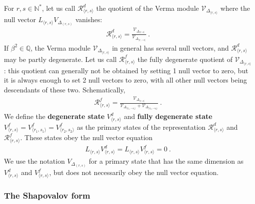 \documentclass[12pt, a4paper]{article}
\newcommand{\myindex}[1]{\textbf{\boldmath #1}}
\theoremstyle{break}
\begin{document}
For $r,s\in\mathbb{N}^*$, let us call $\mathcal{R}^d_{\langle r,s\rangle}$ the quotient of the Verma module $\mathcal{V}_{\Delta_{\langle r,s\rangle}}$ where the null vector $L_{\langle r,s\rangle}V_{\Delta_{(r,s)}}$ vanishes:
\begin{align}
 \mathcal{R}^d_{\langle r,s\rangle} 
 =\frac{\mathcal{V}_{\Delta_{\langle r,s\rangle}}}{\mathcal{V}_{\Delta_{\langle r,-s\rangle}}}\ . 
 \label{rvv}
\end{align}
If $\beta^2\in \mathbb{Q}$, the Verma module $\mathcal{V}_{\Delta_{\langle r,s\rangle}}$ in general has several null vectors, and $\mathcal{R}^d_{\langle r,s\rangle}$ may be partly degenerate. Let us call $\mathcal{R}^f_{\langle r,s\rangle}$ the fully degenerate quotient of  $\mathcal{V}_{\Delta_{\langle r,s\rangle}}$: this quotient can generally not be obtained by setting 1 null vector to zero, but it is always enough to set 2 null vectors to zero, with all other null vectors being descendants of these two. Schematically,
\begin{align}
 \mathcal{R}^f_{\langle r,s\rangle} = \frac{\mathcal{V}_{\Delta_{\langle r,s\rangle}}}{\mathcal{V}_{\Delta_{\langle r_1,-s_1\rangle}}+ \mathcal{V}_{\Delta_{\langle r_2,-s_2\rangle}}}\ .
\end{align}
We define the \myindex{degenerate state} $V^d_{\langle r,s\rangle}$ and \myindex{fully degenerate state} $V^f_{\langle r,s\rangle}=V^f_{\langle r_1,s_1\rangle}=V^f_{\langle r_2,s_2\rangle}$ as the primary states of the representation $\mathcal{R}^d_{\langle r,s\rangle}$ and 
$\mathcal{R}^f_{\langle r,s\rangle}$. These states obey the null vector equation
\begin{align}
L_{\langle r, s\rangle} V^d_{\langle r,s\rangle} = L_{\langle r, s\rangle} V^f_{\langle r,s\rangle} = 0\ .
\label{lvdz}
\end{align}
We use the notation $V_{\Delta_{(r,s)}}$ for a primary state that has the same dimension as $V^d_{\langle r,s\rangle}$ and $V^f_{\langle r,s\rangle}$, but does not necessarily obey the null vector equation. 

\subsubsection{The Shapovalov form}
\end{document}
